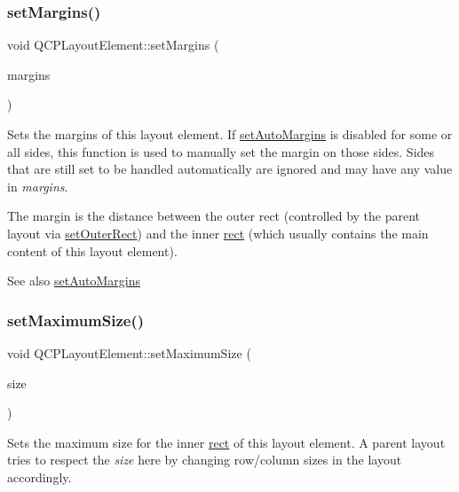 \subsubsection{\texorpdfstring{set\+Margins()}{setMargins()}}
{\footnotesize\ttfamily void Q\+C\+P\+Layout\+Element\+::set\+Margins (\begin{DoxyParamCaption}\item[{const Q\+Margins \&}]{margins }\end{DoxyParamCaption})}

Sets the margins of this layout element. If \mbox{\hyperlink{class_q_c_p_layout_element_accfda49994e3e6d51ed14504abf9d27d}{set\+Auto\+Margins}} is disabled for some or all sides, this function is used to manually set the margin on those sides. Sides that are still set to be handled automatically are ignored and may have any value in {\itshape margins}.

The margin is the distance between the outer rect (controlled by the parent layout via \mbox{\hyperlink{class_q_c_p_layout_element_a38975ea13e36de8e53391ce41d94bc0f}{set\+Outer\+Rect}}) and the inner \mbox{\hyperlink{class_q_c_p_layout_element_a208effccfe2cca4a0eaf9393e60f2dd4}{rect}} (which usually contains the main content of this layout element).

\begin{DoxySeeAlso}{See also}
\mbox{\hyperlink{class_q_c_p_layout_element_accfda49994e3e6d51ed14504abf9d27d}{set\+Auto\+Margins}} 
\end{DoxySeeAlso}
\mbox{\label{class_q_c_p_layout_element_a74eb5280a737ab44833d506db65efd95}} 
\subsubsection{\texorpdfstring{set\+Maximum\+Size()}{setMaximumSize()}\hspace{0.1cm}{\footnotesize\ttfamily [1/2]}}
{\footnotesize\ttfamily void Q\+C\+P\+Layout\+Element\+::set\+Maximum\+Size (\begin{DoxyParamCaption}\item[{const Q\+Size \&}]{size }\end{DoxyParamCaption})}

Sets the maximum size for the inner \mbox{\hyperlink{class_q_c_p_layout_element_a208effccfe2cca4a0eaf9393e60f2dd4}{rect}} of this layout element. A parent layout tries to respect the {\itshape size} here by changing row/column sizes in the layout accordingly. \mbox{\label{class_q_c_p_layout_element_a03e0e9c48f230217c529b0819f832d84}} 
